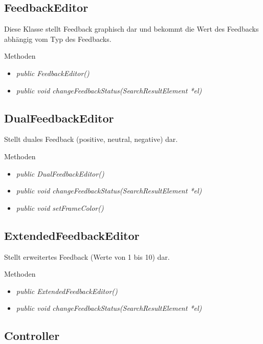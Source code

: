 \subsection*{FeedbackEditor}
Diese Klasse stellt Feedback graphisch dar und bekommt die Wert des Feedbacks abhängig vom Typ des Feedbacks.

Methoden
\begin{itemize}
	\item\textit{public FeedbackEditor()}
	\item\textit{public void changeFeedbackStatus(SearchResultElement *el)}
\end{itemize}

\subsection*{DualFeedbackEditor}
Stellt duales Feedback (positive, neutral, negative) dar.

Methoden
\begin{itemize}
	\item\textit{public DualFeedbackEditor()}
	\item\textit{public void changeFeedbackStatus(SearchResultElement *el)}
	\item\textit{public void setFrameColor()}
\end{itemize}

\subsection*{ExtendedFeedbackEditor}
Stellt erweitertes Feedback (Werte von 1 bis 10) dar.

Methoden
\begin{itemize}
	\item\textit{public ExtendedFeedbackEditor()}
	\item\textit{public void changeFeedbackStatus(SearchResultElement *el)}
\end{itemize}

\pagebreak

\subsection{Controller}

